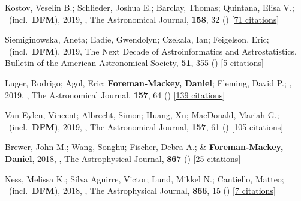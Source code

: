 \item[{\color{numcolor}\scriptsize44}] Kostov, Veselin B.; Schlieder, Joshua E.; Barclay, Thomas; Quintana, Elisa V.; \etal\ (incl.\ \textbf{DFM}), 2019, , The Astronomical Journal, \textbf{158}, 32 () [\href{https://ui.adsabs.harvard.edu/abs/2019AJ....158...32K}{71 citations}]

\item[{\color{numcolor}\scriptsize43}] Siemiginowska, Aneta; Eadie, Gwendolyn; Czekala, Ian; Feigelson, Eric; \etal\ (incl.\ \textbf{DFM}), 2019, The Next Decade of Astroinformatics and Astrostatistics, Bulletin of the American Astronomical Society, \textbf{51}, 355 () [\href{https://ui.adsabs.harvard.edu/abs/2019BAAS...51c.355S}{5 citations}]

\item[{\color{numcolor}\scriptsize42}] Luger, Rodrigo; Agol, Eric; \textbf{Foreman-Mackey, Daniel}; Fleming, David P.; \etal, 2019, , The Astronomical Journal, \textbf{157}, 64 () [\href{https://ui.adsabs.harvard.edu/abs/2019AJ....157...64L}{139 citations}]

\item[{\color{numcolor}\scriptsize41}] Van Eylen, Vincent; Albrecht, Simon; Huang, Xu; MacDonald, Mariah G.; \etal\ (incl.\ \textbf{DFM}), 2019, , The Astronomical Journal, \textbf{157}, 61 () [\href{https://ui.adsabs.harvard.edu/abs/2019AJ....157...61V}{105 citations}]

\item[{\color{numcolor}\scriptsize40}] Brewer, John M.; Wang, Songhu; Fischer, Debra A.; \& \textbf{Foreman-Mackey, Daniel}, 2018, , The Astrophysical Journal, \textbf{867} () [\href{https://ui.adsabs.harvard.edu/abs/2018ApJ...867L...3B}{25 citations}]

\item[{\color{numcolor}\scriptsize39}] Ness, Melissa K.; Silva Aguirre, Victor; Lund, Mikkel N.; Cantiello, Matteo; \etal\ (incl.\ \textbf{DFM}), 2018, , The Astrophysical Journal, \textbf{866}, 15 () [\href{https://ui.adsabs.harvard.edu/abs/2018ApJ...866...15N}{7 citations}]

